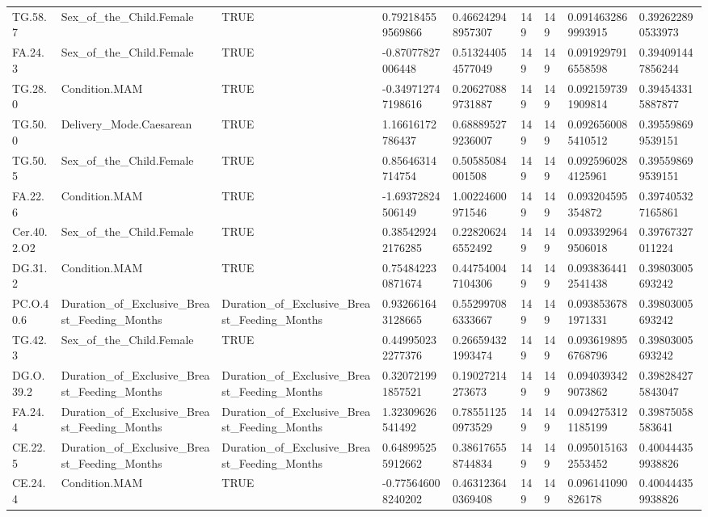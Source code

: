 \begin{longtable}{lllllllll}
TG.58.7 & Sex\_of\_the\_Child.Female & TRUE & 0.792184559569866 & 0.466242948957307 & 149 & 149 & 0.0914632869993915 & 0.392622890533973 \\
FA.24.3 & Sex\_of\_the\_Child.Female & TRUE & -0.87077827006448 & 0.513244054577049 & 149 & 149 & 0.0919297916558598 & 0.394091447856244 \\
TG.28.0 & Condition.MAM & TRUE & -0.349712747198616 & 0.206270889731887 & 149 & 149 & 0.0921597391909814 & 0.394543315887877 \\
TG.50.0 & Delivery\_Mode.Caesarean & TRUE & 1.16616172786437 & 0.688895279236007 & 149 & 149 & 0.0926560085410512 & 0.395598699539151 \\
TG.50.5 & Sex\_of\_the\_Child.Female & TRUE & 0.85646314714754 & 0.50585084001508 & 149 & 149 & 0.0925960284125961 & 0.395598699539151 \\
FA.22.6 & Condition.MAM & TRUE & -1.69372824506149 & 1.00224600971546 & 149 & 149 & 0.093204595354872 & 0.397405327165861 \\
Cer.40.2.O2 & Sex\_of\_the\_Child.Female & TRUE & 0.385429242176285 & 0.228206246552492 & 149 & 149 & 0.0933929649506018 & 0.39767327011224 \\
DG.31.2 & Condition.MAM & TRUE & 0.754842230871674 & 0.447540047104306 & 149 & 149 & 0.0938364412541438 & 0.39803005693242 \\
PC.O.40.6 & Duration\_of\_Exclusive\_Breast\_Feeding\_Months & Duration\_of\_Exclusive\_Breast\_Feeding\_Months & 0.932661643128665 & 0.552997086333667 & 149 & 149 & 0.0938536781971331 & 0.39803005693242 \\
TG.42.3 & Sex\_of\_the\_Child.Female & TRUE & 0.449950232277376 & 0.266594321993474 & 149 & 149 & 0.0936198956768796 & 0.39803005693242 \\
DG.O.39.2 & Duration\_of\_Exclusive\_Breast\_Feeding\_Months & Duration\_of\_Exclusive\_Breast\_Feeding\_Months & 0.320721991857521 & 0.19027214273673 & 149 & 149 & 0.0940393429073862 & 0.398284275843047 \\
FA.24.4 & Duration\_of\_Exclusive\_Breast\_Feeding\_Months & Duration\_of\_Exclusive\_Breast\_Feeding\_Months & 1.32309626541492 & 0.785511250973529 & 149 & 149 & 0.0942753121185199 & 0.39875058583641 \\
CE.22.5 & Duration\_of\_Exclusive\_Breast\_Feeding\_Months & Duration\_of\_Exclusive\_Breast\_Feeding\_Months & 0.648995255912662 & 0.386176558744834 & 149 & 149 & 0.0950151632553452 & 0.400444359938826 \\
CE.24.4 & Condition.MAM & TRUE & -0.775646008240202 & 0.463123640369408 & 149 & 149 & 0.096141090826178 & 0.400444359938826 \\

\end{longtable}
